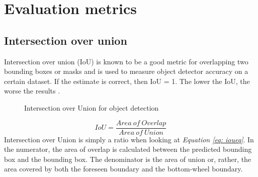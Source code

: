 \section{Evaluation metrics}
\subsection{Intersection over union}
Intersection over union (IoU) is known to be a good metric for overlapping two bounding boxes or masks and is used to measure object detector accuracy on a certain dataset. If the estimate is correct, then IoU = 1. The lower the IoU, the worse the results \cite{sheremet_intersection_2020}.

\begin{figure}[h]
    \centering
    \hfill
    \caption{Intersection over Union for object detection \cite{rosebrock_intersection_2016}}
    \label{figure: iou}
\end{figure}

\begin{equation}
    IoU = \frac{Area\ of\ Overlap}{Area\ of\ Union} \label{eq: ioueq}
\end{equation}
\vspace{0.5cm}
Intersection over Union is simply a ratio when looking at \textit{Equation \ref{eq: ioueq}}. In the numerator, the area of overlap is calculated between the predicted bounding box and the bounding box.
The denominator is the area of union or, rather, the area covered by both the foreseen boundary and the bottom-wheel boundary\cite{uavs_comparing_2019}.
\vspace{1cm}
